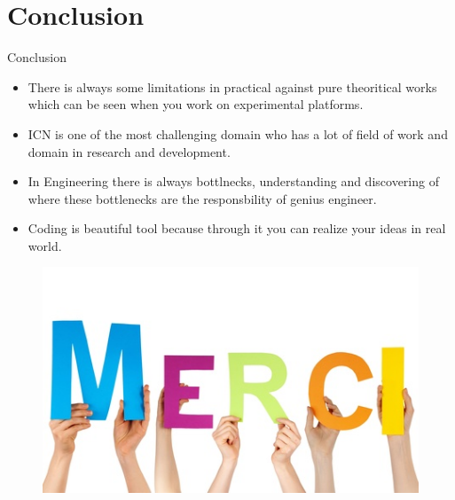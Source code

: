 \documentclass[8pt]{beamer}
\newcommand{\1}{\mathbbm 1}
\begin{document}

\section{Conclusion}

\begin{frame}{Conclusion}
\begin{itemize}
 
\item There is always some limitations in practical against pure theoritical works which can be seen when you work on experimental platforms.
\item ICN is one of the most challenging domain who has a lot of field of work and domain in research and development.
\item In Engineering there is always bottlnecks, understanding and discovering of where these bottlenecks are the responsbility of genius engineer.

\item Coding is beautiful tool because through it you can realize your ideas in real world.
\end{itemize}

\end{frame}


\begin{frame}



\begin{figure}[h!]
  \centering
    \includegraphics[scale=0.5]{figures/merci.jpg}
\end{figure}



\end{frame}
\end{document}
